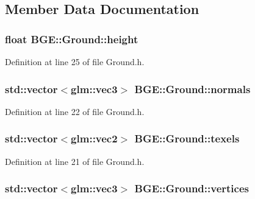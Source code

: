 \subsection{Member Data Documentation}
\hypertarget{class_b_g_e_1_1_ground_a05be7c85e646d088a59102805bea4d5a}{
\subsubsection[{height}]{\setlength{\rightskip}{0pt plus 5cm}float B\-G\-E\-::\-Ground\-::height}}\label{class_b_g_e_1_1_ground_a05be7c85e646d088a59102805bea4d5a}


Definition at line 25 of file Ground.\-h.

\hypertarget{class_b_g_e_1_1_ground_a1b9a708b7fa56dfd5aa0c1a60d1826eb}{
\subsubsection[{normals}]{\setlength{\rightskip}{0pt plus 5cm}std\-::vector$<$glm\-::vec3$>$ B\-G\-E\-::\-Ground\-::normals}}\label{class_b_g_e_1_1_ground_a1b9a708b7fa56dfd5aa0c1a60d1826eb}


Definition at line 22 of file Ground.\-h.

\hypertarget{class_b_g_e_1_1_ground_a93187bd4ab9d67b14ae3ae140c12a0ed}{
\subsubsection[{texels}]{\setlength{\rightskip}{0pt plus 5cm}std\-::vector$<$glm\-::vec2$>$ B\-G\-E\-::\-Ground\-::texels}}\label{class_b_g_e_1_1_ground_a93187bd4ab9d67b14ae3ae140c12a0ed}


Definition at line 21 of file Ground.\-h.

\hypertarget{class_b_g_e_1_1_ground_abbdcaa953344fcb3d742a0829823b2a5}{
\subsubsection[{vertices}]{\setlength{\rightskip}{0pt plus 5cm}std\-::vector$<$glm\-::vec3$>$ B\-G\-E\-::\-Ground\-::vertices}}\label{class_b_g_e_1_1_ground_abbdcaa953344fcb3d742a0829823b2a5}


